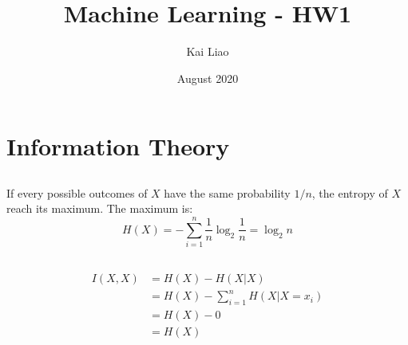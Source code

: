 \documentclass{article}
\title{Machine Learning - HW1}
\author{Kai Liao}
\date{August 2020}
\begin{document}
\maketitle

\section{Information Theory}
\subsection{}
If every possible outcomes of $X$ have the same probability $1/n$, the entropy of $X$ reach its maximum. 
The maximum is:
\begin{equation}
    H(X) = -\sum_{i = 1}^n \frac{1}{n} \log_2 \frac{1}{n} = \log_2 n
\end{equation}

\subsection{}
\begin{equation}
\begin{split}
    I(X,X) &= H(X) - H(X|X) \\
    &= H(X) - \sum_{i = 1}^n H(X | X=x_i)\\
    &= H(X) - 0\\
    &= H(X)
\end{split}
\end{equation}
\end{document}
